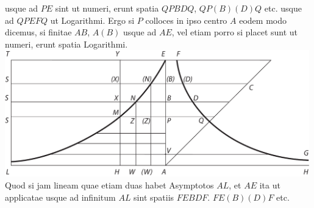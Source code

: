 usque ad $\displaystyle PE$
sint ut numeri, erunt spatia $\displaystyle QPBDQ$, $\displaystyle QP(B)(D)Q$ etc. usque ad $\displaystyle QPEFQ$
ut Logarithmi.
Ergo si $\displaystyle P$ colloces in ipso centro $\displaystyle A$
eodem modo dicemus, si finitae $\displaystyle AB$, $\displaystyle A(B)$
usque ad $\displaystyle AE$, vel etiam porro si placet sunt ut numeri, erunt spatia
Logarithmi.
\pend
\newpage
\pstart 
\noindent
\includegraphics[trim = 0mm -3mm 0mm 0mm, clip, width=0.99\textwidth]{images/lh0350911_009r-d1.pdf}
\pend
\count{}
\count{}
\count{}
\vspace{6mm}
\pstart
Quod si jam lineam
quae etiam duas habet Asymptotos $\displaystyle AL$, et $\displaystyle AE$
ita ut applicatae
usque ad infinitum $\displaystyle AL$
sint spatiis $\displaystyle FEBDF.$ $\displaystyle FE(B)(D)F$ etc.
